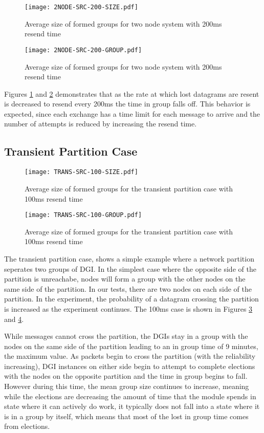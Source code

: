 \begin{figure}[!h]
\centering
\texttt{[image: 2NODE-SRC-200-SIZE.pdf]}
\caption{Average size of formed groups for two node system with 200ms resend time}
\label{fig:MGS-2NODE-200}
\end{figure}

\begin{figure}[!h]
\centering
\texttt{[image: 2NODE-SRC-200-GROUP.pdf]}
\caption{Average size of formed groups for two node system with 200ms resend time}
\label{fig:IGT-2NODE-200}
\end{figure}

Figures \ref{fig:MGS-2NODE-200} and \ref{fig:IGT-2NODE-200} demonstrates that as the
rate at which lost datagrams are resent is decreased to resend every 200ms the
time in group falls off. This behavior is expected, since each exchange has a
time limit for each message to arrive and the number of attempts is reduced by
increasing the resend time.

\subsection{Transient Partition Case}

\begin{figure}[!h]
\centering
\texttt{[image: TRANS-SRC-100-SIZE.pdf]}
\caption{Average size of formed groups for the transient partition case with 100ms resend time}
\label{fig:MGS-TRANS-100}
\end{figure}

\begin{figure}[!h]
\centering
\texttt{[image: TRANS-SRC-100-GROUP.pdf]}
\caption{Average size of formed groups for the transient partition case with 100ms resend time}
\label{fig:IGT-TRANS-100}
\end{figure}

The transient partition case, shows a simple example where a network partition
seperates two groups of DGI. In the simplest case where the opposite side of
the partition is unreachabe, nodes will form a group with the other nodes on the
same side of the partition. In our tests, there are two nodes on each side of
the partition. In the experiment, the probability of a datagram crossing the
partition is increased as the experiment continues. The 100ms case is shown in
Figures \ref{fig:MGS-TRANS-100} and \ref{fig:IGT-TRANS-100}.

While messages cannot cross the partition, the DGIs stay in a group with the
nodes on the same side of the partition leading to an in group time of 9 minutes,
the maximum value. As packets begin to cross the partition (with the reliability
increasing), DGI instances on either side begin to attempt to complete elections
with the nodes on the opposite partition and the time in group begins to fall.
However during this time, the mean group size continues to increase, meaning
while the elections are decreasing the amount of time that the module spends in
state where it can actively do work, it typically does not fall into a state
where it is in a group by itself, which means that most of the lost in group
time comes from elections.


